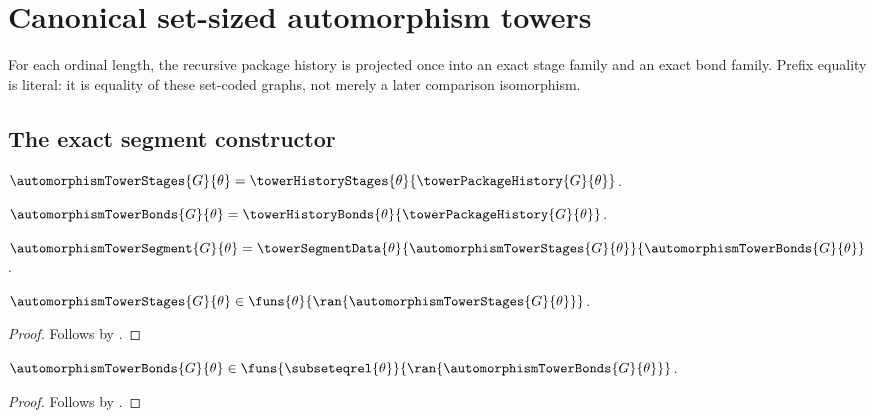 

\section{Canonical set-sized automorphism towers}

For each ordinal length, the recursive package history is projected once into
an exact stage family and an exact bond family.  Prefix equality is literal:
it is equality of these set-coded graphs, not merely a later comparison
isomorphism.

\subsection{The exact segment constructor}

\begin{definition}\label{automorphism_tower_stages}
    $\automorphismTowerStages{G}{\theta}=
        \towerHistoryStages{\theta}{\towerPackageHistory{G}{\theta}}$.
\end{definition}

\begin{definition}\label{automorphism_tower_bonds}
    $\automorphismTowerBonds{G}{\theta}=
        \towerHistoryBonds{\theta}{\towerPackageHistory{G}{\theta}}$.
\end{definition}

\begin{definition}\label{automorphism_tower_segment}
    $\automorphismTowerSegment{G}{\theta}=
        \towerSegmentData{\theta}
            {\automorphismTowerStages{G}{\theta}}
            {\automorphismTowerBonds{G}{\theta}}$.
\end{definition}

\begin{proposition}\label{automorphism_tower_stages_type}
    $\automorphismTowerStages{G}{\theta}\in
        \funs{\theta}{\ran{\automorphismTowerStages{G}{\theta}}}$.
\end{proposition}
\begin{proof}
    Follows by
        .
\end{proof}

\begin{proposition}\label{automorphism_tower_bonds_type}
    $\automorphismTowerBonds{G}{\theta}\in
        \funs{\subseteqrel{\theta}}{
            \ran{\automorphismTowerBonds{G}{\theta}}}$.
\end{proposition}
\begin{proof}
    Follows by
        .
\end{proof}

